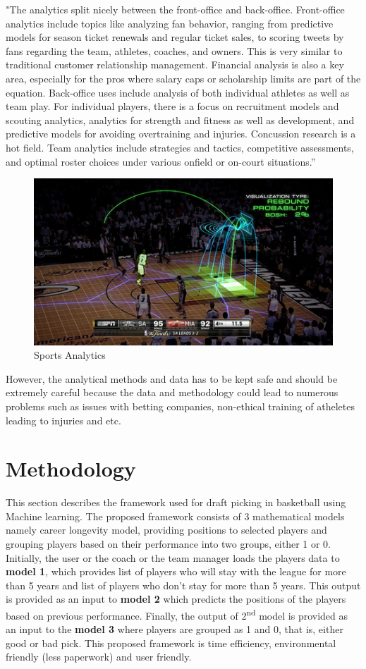 \documentclass[format=sigconf]{acmart}
\begin{document}
"The analytics split nicely between the front-office and back-office. Front-office analytics
include topics like analyzing fan behavior, ranging from predictive models for season ticket
renewals and regular ticket sales, to scoring tweets by fans regarding the team, athletes,
coaches, and owners. This is very similar to traditional customer relationship management.
Financial analysis is also a key area, especially for the pros where salary caps or scholarship
limits are part of the equation. Back-office uses include analysis of both individual athletes as
well as team play. For individual players, there is a focus on recruitment models and scouting
analytics, analytics for strength and fitness as well as development, and predictive models for
avoiding overtraining and injuries. Concussion research is a hot field. Team analytics include
strategies and tactics, competitive assessments, and optimal roster choices under various onfield or on-court situations.” \cite{tichy2016changing}
\begin{figure}[H]
    \centering
    \includegraphics[scale=0.50]{images/sportsanalytics.jpg}
    \caption{Sports Analytics}
    \label{fig:sa}
\end{figure}
However, the analytical methods and data has to be kept safe and should be extremely careful because the data and methodology
could lead to numerous problems such as issues with betting companies, non-ethical training of atheletes leading to injuries and 
etc. \cite{spa}
\section{Methodology}
This section describes the framework used for draft picking in basketball using Machine learning. The proposed framework consists of 
3 mathematical models namely career longevity model, providing positions to selected players and grouping players based on their 
performance into two groups, either 1 or 0. Initially, the user or the coach or the team manager loads the players data to \textbf{model 1},
which provides list of players who will stay with the league for more than 5 years and list of players who don't stay for more than
5 years. This output is provided as an input to \textbf{model 2} which predicts the positions of the players based on previous 
performance. Finally, the output of 2\textsuperscript{nd} model is provided as an input to the \textbf{model 3} where players are 
grouped as 1 and 0, that is, either good or bad pick. This proposed framework is time efficiency, environmental friendly (less 
paperwork) and user friendly.
\end{document}
